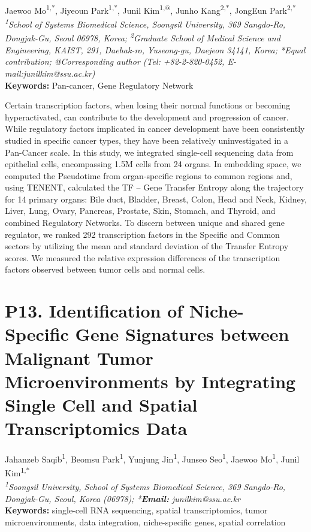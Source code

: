 \begin{center}
Jaewoo Mo\textsuperscript{1,*}, Jiyeoun Park\textsuperscript{1,*}, Junil Kim\textsuperscript{1,@}, Junho Kang\textsuperscript{2,*}, JongEun Park\textsuperscript{2,*} \\
\vspace{0.3cm}
\textit{\textsuperscript{1}School of Systems Biomedical Science, Soongsil University, 369 Sangdo-Ro, Dongjak-Gu, Seoul 06978, Korea; \textsuperscript{2}Graduate School of Medical Science and Engineering, KAIST, 291, Daehak-ro, Yuseong-gu, Daejeon 34141, Korea; *Equal contribution; @Corresponding author (Tel: +82-2-820-0452, E-mail:junilkim@ssu.ac.kr)} \\
\vspace{0.3cm}
\textbf{Keywords:} Pan-cancer, Gene Regulatory Network
\end{center}

\noindent
Certain transcription factors, when losing their normal functions or becoming hyperactivated, can contribute to the development and progression of cancer. While regulatory factors implicated in cancer development have been consistently studied in specific cancer types, they have been relatively uninvestigated in a Pan-Cancer scale. In this study, we integrated single-cell sequencing data from epithelial cells, encompassing 1.5M cells from 24 organs. In embedding space, we computed the Pseudotime from organ-specific regions to common regions and, using TENENT, calculated the TF – Gene Transfer Entropy along the trajectory for 14 primary organs: Bile duct, Bladder, Breast, Colon, Head and Neck, Kidney, Liver, Lung, Ovary, Pancreas, Prostate, Skin, Stomach, and Thyroid, and combined Regulatory Networks. To discern between unique and shared gene regulator, we ranked 292 transcription factors in the Specific and Common sectors by utilizing the mean and standard deviation of the Transfer Entropy scores. We measured the relative expression differences of the transcription factors observed between tumor cells and normal cells.
\newpage

\section*{P13. Identification of Niche-Specific Gene Signatures between Malignant Tumor Microenvironments by Integrating Single Cell and Spatial Transcriptomics Data}

\begin{center}
Jahanzeb Saqib\textsuperscript{1}, Beomsu Park\textsuperscript{1}, Yunjung Jin\textsuperscript{1}, Junseo Seo\textsuperscript{1}, Jaewoo Mo\textsuperscript{1}, Junil Kim\textsuperscript{1,*} \\
\vspace{0.3cm}
\textit{\textsuperscript{1}Soongsil University, School of Systems Biomedical Science, 369 Sangdo-Ro, Dongjak-Gu, Seoul, Korea (06978); *\textbf{Email:} junilkim@ssu.ac.kr} \\
\vspace{0.3cm}
\textbf{Keywords:} single-cell RNA sequencing, spatial transcriptomics, tumor microenvironments, data integration, niche-specific genes, spatial correlation
\end{center}

